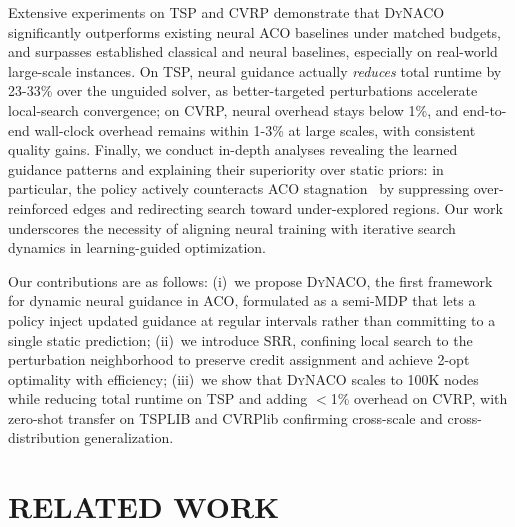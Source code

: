 \documentclass[sigconf]{acmart}
\newcommand{\DyNACO}{\textsc{DyNACO}}
\begin{document}
Extensive experiments on TSP and CVRP demonstrate that \DyNACO{} significantly outperforms existing neural ACO baselines under matched budgets, and surpasses established classical and neural baselines, especially on real-world large-scale instances. On TSP, neural guidance actually \emph{reduces} total runtime by 23-33\% over the unguided solver, as better-targeted perturbations accelerate local-search convergence; on CVRP, neural overhead stays below 1\%, and end-to-end wall-clock overhead remains within 1-3\% at large scales, with consistent quality gains. Finally, we conduct in-depth analyses revealing the learned guidance patterns and explaining their superiority over static priors: in particular, the policy actively counteracts ACO stagnation~\cite{stagnation} by suppressing over-reinforced edges and redirecting search toward under-explored regions. Our work underscores the necessity of aligning neural training with iterative search dynamics in learning-guided optimization.

Our contributions are as follows:
(i)~we propose \DyNACO{}, the first framework for dynamic neural guidance in ACO, formulated as a semi-MDP that lets a policy inject updated guidance at regular intervals rather than committing to a single static prediction;
(ii)~we introduce SRR, confining local search to the perturbation neighborhood to preserve credit assignment and achieve 2-opt optimality with efficiency;
(iii)~we show that \DyNACO{} scales to 100K nodes while reducing total runtime on TSP and adding $<$1\% overhead on CVRP, with zero-shot transfer on TSPLIB and CVRPlib confirming cross-scale and cross-distribution generalization.

\section{RELATED WORK}
\label{sec:related-nco}
\end{document}
